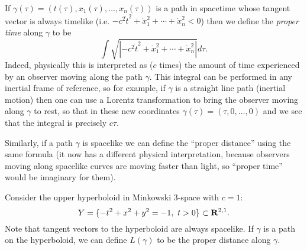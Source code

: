\documentclass[12pt]{article}
\begin{document}
If $\gamma(\tau)=(t(\tau),x_1(\tau),\ldots,x_n(\tau))$ is a path in spacetime whose tangent vector is always timelike (i.e. $-c^2\dot{t}^2+\dot{x}_1^2+\cdots+\dot{x}_n^2<0$) then we define the {\em proper time} along $\gamma$ to be
\[\int\sqrt{\left|-c^2\dot{t}^2+\dot{x}_1^2+\cdots+\dot{x}_n^2\right|}d\tau.\]
Indeed, physically this is interpreted as ($c$ times) the amount of time experienced by an observer moving along the path $\gamma$. This integral can be performed in any inertial frame of reference, so for example, if $\gamma$ is a straight line path (inertial motion) then one can use a Lorentz transformation to bring the observer moving along $\gamma$ to rest, so that in these new coordinates $\gamma(\tau)=(\tau,0,\ldots,0)$ and we see that the integral is precisely $c\tau$.

Similarly, if a path $\gamma$ is spacelike we can define the ``proper distance'' using the same formula (it now has a different physical interpretation, because observers moving along spacelike curves are moving faster than light, so ``proper time'' would be imaginary for them).

\begin{dfn}
  Consider the upper hyperboloid in Minkowski 3-space with $c=1$:
  \[Y=\{-t^2+x^2+y^2=-1,\ t>0\}\subset\RR^{2,1}.\]
  Note that tangent vectors to the hyperboloid are always spacelike. If $\gamma$ is a path on the hyperboloid, we can define $L(\gamma)$ to be the proper distance along $\gamma$.
\end{dfn}
\end{document}
